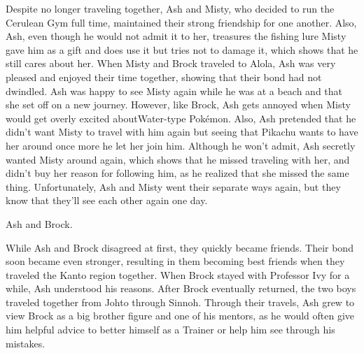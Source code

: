\documentclass[a4paper,12pt]{article}
\begin{document}
Despite no longer traveling together, Ash and Misty, who decided to run the Cerulean Gym full time, maintained their strong friendship for one another. Also, Ash, even though he would not admit it to her, treasures the fishing lure Misty gave him as a gift and does use it but tries not to damage it, which shows that he still cares about her. When Misty and Brock traveled to Alola, Ash was very pleased and enjoyed their time together, showing that their bond had not dwindled. Ash was happy to see Misty again while he was at a beach and that she set off on a new journey. However, like Brock, Ash gets annoyed when Misty would get overly excited aboutWater-type Pokémon. Also, Ash pretended that he didn't want Misty to travel with him again but seeing that Pikachu wants to have her around once more he let her join him. Although he won't admit, Ash secretly wanted Misty around again, which shows that he missed traveling with her, and didn't buy her reason for following him, as he realized that she missed the same thing. Unfortunately, Ash and Misty went their separate ways again, but they know that they'll see each other again one day.\\ \par \vspace{0.5cm}

Ash and Brock.\\ \par \vspace{0.5cm}

While Ash and Brock disagreed at first, they quickly became friends. Their bond soon became even stronger, resulting in them becoming best friends when they traveled the Kanto region together. When Brock stayed with Professor Ivy for a while, Ash understood his reasons. After Brock eventually returned, the two boys traveled together from Johto through Sinnoh. Through their travels, Ash grew to view Brock as a big brother figure and one of his mentors, as he would often give him helpful advice to better himself as a Trainer or help him see through his mistakes.\\ \par \vspace{0.5cm}
\end{document}
